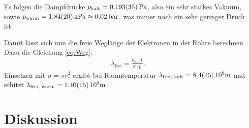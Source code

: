	Es folgen die Dampfdrücke $p_\text{kalt} = \SI{0.193+-0.035}{\pascal}$, also ein sehr starkes Vakuum, sowie $p_\text{warm} = \SI{1.84+-0.20}{\kilo\pascal}\approx \SI{0.02}{\bar}$, was immer noch ein sehr geringer Druck ist.
	
	Damit lässt sich nun die freie Weglänge der Elektronen in der Röhre berechnen.
	Dazu die Gleichung \ref{eq:Weg}:
	\begin{align} \label{eq:Weg}
		\lambda_\text{frei} = \frac{k_\text{B}\cdot T}{\sigma\cdot p}.
	\end{align}
 	Einsetzen mit $\sigma = \pi r_e^2$\cite{Constants} ergibt bei Raumtemperatur $\lambda_\text{frei, kalt} = \SI{8.4+-1.5}{10^8\meter}$ und erhitzt $\lambda_\text{frei, warm} = \SI{1.40+-0.15}{10^6\meter}$. 

\section{Diskussion}
	
